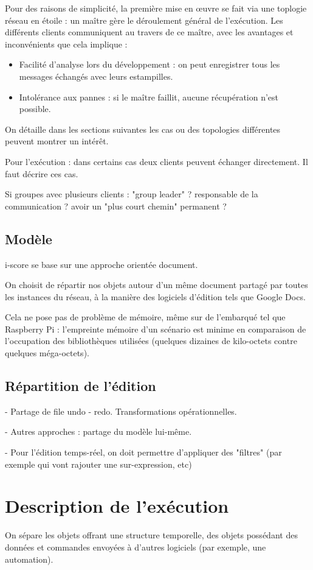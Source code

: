 \documentclass{article}
\begin{document}
Pour des raisons de simplicité, la première mise en œuvre se fait via une toplogie réseau en étoile : un maître gère 
le déroulement général de l'exécution. 
Les différents clients communiquent au travers de ce maître, avec les avantages et inconvénients que cela implique : 
\begin{itemize}
	\item Facilité d'analyse lors du développement : on peut enregistrer tous les messages échangés avec leurs estampilles.
	\item Intolérance aux pannes : si le maître faillit, aucune récupération n'est possible.
\end{itemize}

On détaille dans les sections suivantes les cas ou des topologies différentes peuvent montrer un intérêt.

Pour l'exécution : dans certains cas deux clients peuvent échanger directement.
Il faut décrire ces cas.

Si groupes avec plusieurs clients : "group leader" ? responsable de la communication ? avoir un "plus court chemin" permanent ?

\subsection{Modèle}
i-score se base sur une approche orientée document.

On choisit de répartir nos objets autour d'un même document partagé par toutes les instances du réseau, 
à la manière des logiciels d'édition tels que Google Docs. %

Cela ne pose pas de problème de mémoire, même sur de l'embarqué tel que Raspberry Pi : l'empreinte mémoire d'un scénario est minime en comparaison de l'occupation des bibliothèques utilisées (quelques dizaines de kilo-octets contre quelques méga-octets).

\subsection{Répartition de l'édition}
- Partage de file undo - redo. Transformations opérationnelles. %

- Autres approches : partage du modèle lui-même.

- Pour l'édition temps-réel, on doit permettre d'appliquer des "filtres" (par exemple qui vont rajouter une sur-expression, etc)

\section{Description de l'exécution}\label{sec.description}
On sépare les objets offrant une structure temporelle, des objets possédant des données et commandes envoyées à d'autres logiciels (par exemple, une automation).
\end{document}
